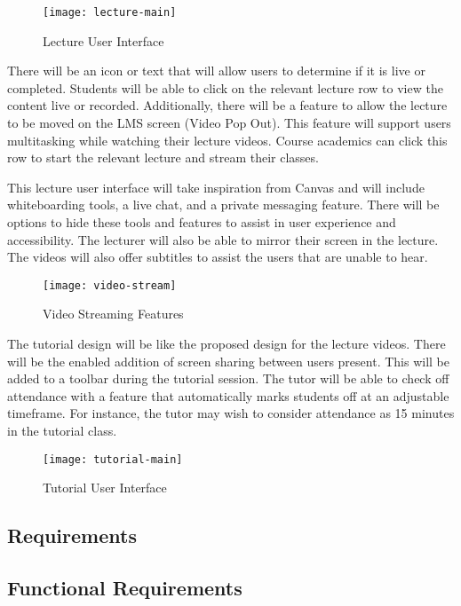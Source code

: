 \begin{figure}[h!]
    \centering
    \texttt{[image: lecture-main]}
    \caption{Lecture User Interface}
\end{figure}

There will be an icon or text that will allow users to determine if it is live or completed. Students will be able to click on the relevant lecture row to view the 
content live or recorded. Additionally, there will be a feature to allow the lecture to be moved on the LMS screen (Video Pop Out). This feature will support users 
multitasking while watching their lecture videos. Course academics can click this row to start the relevant lecture and stream their classes. 

This lecture user interface will take inspiration from Canvas and will include whiteboarding tools, a live chat, and a private messaging feature. There will be 
options to hide these tools and features to assist in user experience and accessibility. The lecturer will also be able to mirror their screen in the lecture. The 
videos will also offer subtitles to assist the users that are unable to hear. 

\begin{figure}[h!]
  \centering
  \texttt{[image: video-stream]}
  \caption{Video Streaming Features}
\end{figure}

The tutorial design will be like the proposed design for the lecture videos. There will be the enabled addition of screen sharing between users present. 
This will be added to a toolbar during the tutorial session. The tutor will be able to check off attendance with a feature that automatically marks students 
off at an adjustable timeframe. For instance, the tutor may wish to consider attendance as 15 minutes in the tutorial class. 

\begin{figure}[h!]
    \centering
    \texttt{[image: tutorial-main]}
    \caption{Tutorial User Interface}
\end{figure}
\newpage

\subsection{Requirements}
\subsection{Functional Requirements}

